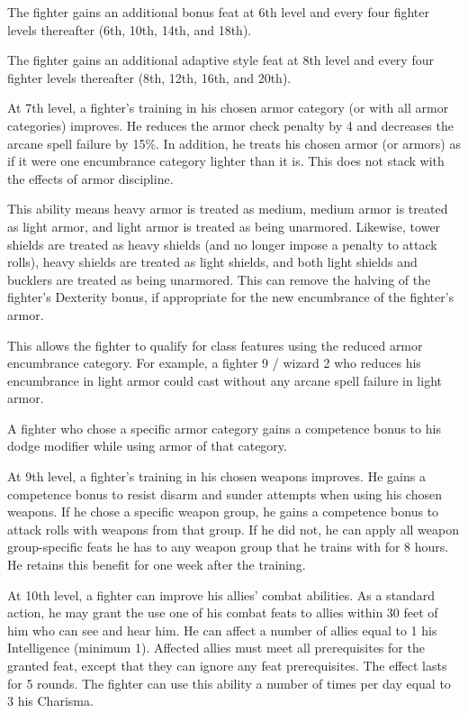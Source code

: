  The fighter gains an additional bonus feat at 6th level and every four fighter levels thereafter (6th, 10th, 14th, and 18th).

 The fighter gains an additional adaptive style feat at 8th level and every four fighter levels thereafter (8th, 12th, 16th, and 20th).

 At 7th level, a fighter's training in his chosen armor category (or with all armor categories) improves. He reduces the armor check penalty by 4 and decreases the arcane spell failure by 15\%. In addition, he treats his chosen armor (or armors) as if it were one encumbrance category lighter than it is. This does not stack with the effects of armor discipline.
\par This ability means heavy armor is treated as medium, medium armor is treated as light armor, and light armor is treated as being unarmored. Likewise, tower shields are treated as heavy shields (and no longer impose a  penalty to attack rolls), heavy shields are treated as light shields, and both light shields and bucklers are treated as being unarmored. This can remove the halving of the fighter's Dexterity bonus, if appropriate for the new encumbrance of the fighter's armor.
\par This allows the fighter to qualify for class features using the reduced armor encumbrance category. For example, a fighter 9 / wizard 2 who reduces his encumbrance in light armor could cast without any arcane spell failure in light armor.
\par A fighter who chose a specific armor category gains a  competence bonus to his dodge modifier while using armor of that category.

 At 9th level, a fighter's training in his chosen weapons improves. He gains a  competence bonus to resist disarm and sunder attempts when using his chosen weapons. If he chose a specific weapon group, he gains a  competence bonus to attack rolls with weapons from that group. If he did not, he can apply all weapon group-specific feats he has to any weapon group that he trains with for 8 hours. He retains this benefit for one week after the training.

 At 10th level, a fighter can improve his allies' combat abilities. As a standard action, he may grant the use one of his combat feats to allies within 30 feet of him who can see and hear him. He can affect a number of allies equal to 1 \add his Intelligence (minimum 1). Affected allies must meet all prerequisites for the granted feat, except that they can ignore any feat prerequisites. The effect lasts for 5 rounds. The fighter can use this ability a number of times per day equal to 3 \add his Charisma.

